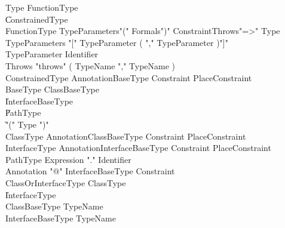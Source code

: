\begin{grammar}
Type \: FunctionType \\
    \| ConstrainedType  \\

FunctionType \: TypeParameters\opt \xcd"(" Formals\opt \xcd")"
Constraint\opt Throws\opt \xcd"=>" Type \\
TypeParameters \: \xcd"[" TypeParameter ( \xcd"," TypeParameter )\star \xcd"]" \\
TypeParameter \: Identifier \\
Throws \: \xcd"throws" ( TypeName \xcd"," TypeName )\star \\

ConstrainedType \: Annotation\star BaseType Constraint\opt
PlaceConstraint\opt \\

BaseType \: ClassBaseType \\
     \| InterfaceBaseType \\
     \| PathType \\
     \| \xcd"(" Type \xcd")" \\

ClassType \: Annotation\star ClassBaseType Constraint\opt
PlaceConstraint\opt \\
InterfaceType \: Annotation\star InterfaceBaseType Constraint\opt
PlaceConstraint\opt \\

PathType \: Expression \xcd"." Identifier \\

Annotation \: \xcd"@" InterfaceBaseType Constraint\opt \\

ClassOrInterfaceType \: ClassType \\ \| InterfaceType \\
ClassBaseType \: TypeName \\
InterfaceBaseType \: TypeName \\
\end{grammar}

% 


